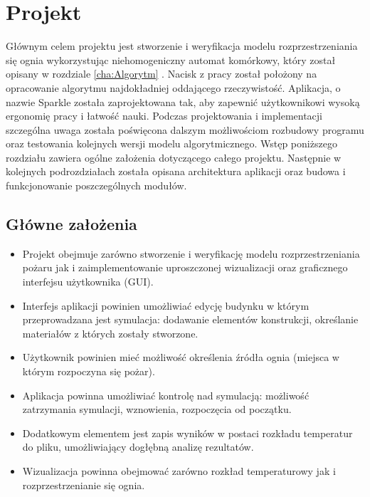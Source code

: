 \chapter {Projekt}
Głównym celem projektu jest stworzenie i weryfikacja modelu rozprzestrzeniania się ognia wykorzystując niehomogeniczny automat
komórkowy, który został opisany w rozdziale \ref{cha:Algorytm} . Nacisk z pracy został położony na opracowanie algorytmu najdokładniej oddającego rzeczywistość.
Aplikacja, o nazwie Sparkle została zaprojektowana tak, aby zapewnić użytkownikowi wysoką ergonomię pracy i łatwość nauki.
Podczas projektowania i implementacji szczególna uwaga została poświęcona dalszym możliwościom rozbudowy programu oraz testowania 
kolejnych wersji modelu algorytmicznego. Wstęp poniższego rozdziału zawiera ogólne założenia dotyczącego całego projektu. 
Następnie w kolejnych podrozdziałach została opisana architektura aplikacji oraz budowa i funkcjonowanie poszczególnych modułów.
\label{cha:projekt}
\section {Główne założenia}
\begin {itemize}
\item Projekt obejmuje zarówno stworzenie i weryfikację modelu rozprzestrzeniania pożaru jak i zaimplementowanie uproszczonej wizualizacji oraz graficznego interfejsu użytkownika (GUI).
\item Interfejs aplikacji powinien umożliwiać edycję budynku w którym przeprowadzana jest symulacja: dodawanie elementów konstrukcji, 
określanie materiałów z których zostały stworzone. 
\item Użytkownik powinien mieć możliwość określenia źródła ognia (miejsca w którym rozpoczyna się pożar).
\item Aplikacja powinna umożliwiać kontrolę nad symulacją: możliwość zatrzymania symulacji, wznowienia, rozpoczęcia od początku.
\item Dodatkowym elementem jest zapis wyników w postaci rozkładu temperatur do pliku, umożliwiający dogłębną analizę rezultatów.
\item Wizualizacja powinna obejmować zarówno rozkład temperaturowy jak i rozprzestrzenianie się ognia. 
\end {itemize}
